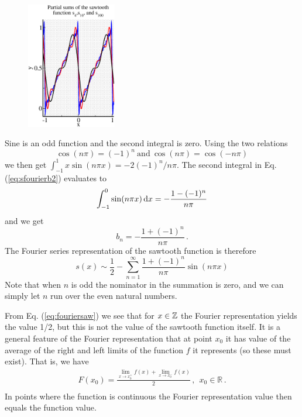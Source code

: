 \begin{example}
	\begin{figure}
	\centering
	\includegraphics[width=0.35\textwidth]{figs/fouriersawtooth.eps}
	\caption*{}
	\end{figure}



	Sine is an odd function and the second integral is zero. Using the two relations
		\begin{equation}
			\cos(n\pi) = (-1)^n \ \text{and} \ \cos(n\pi) = \cos(-n \pi)
		\end{equation}
		we then get $\int_{-1}^1 x \sin (n\pi x) = -2(-1)^n/n\pi$. The second integral in Eq. 
		(\ref{eq:sfourierb2}) evaluates to 
		\begin{equation}
			\int_{-1}^0 \sin(n \pi x) \, \mathrm{d} x = - \frac{1 - (-1)^n}{n\pi}
		\end{equation}
		and we get 
		\begin{equation}
			b_n = -\frac{1 + (-1)^n}{n \pi} \, .
		\end{equation}	 
		The Fourier series representation of the sawtooth function is therefore
		\begin{equation}
			\label{eq:fouriersaw}
			s(x) \sim \frac{1}{2} - \sum_{n=1}^\infty  \frac{1 + (-1)^n}{n \pi} \sin(n\pi x) 
		\end{equation}
		Note that when $n$ is odd the nominator in the summation is zero, and we can simply 
		let $n$ run over the even natural numbers.
\end{example}


\noindent From Eq. (\ref{eq:fouriersaw}) we see that for $x \in \mathbb{Z}$ the Fourier representation yields 
the value 1/2, but this is not the value of the sawtooth function itself. 
It is a general feature of the Fourier representation that at point $x_0$ it has value of the average of the right and 
left limits of the function $f$ it represents (so these must exist). That is, we have
\begin{eqnarray}
	F(x_0) = \frac{ \lim_{x \rightarrow x_0^+}f(x) + \lim_{x \rightarrow
	x_0^-}f(x) }{2} \, , \ \  x_0 \in \mathbb{R} \, . \nonumber \\
\end{eqnarray}
In points where the function is continuous 
the Fourier representation value then equals the function value. 

